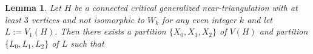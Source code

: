 \documentclass[12pt]{article}
\newtheorem{lem}{Lemma}
\theoremstyle{definition}
\newcommand{\pat}[1]{[\textcolor{red}{PM: #1}]}
\begin{document}
\begin{lem}\label{critical}
  Let $H$ be a connected critical generalized near-triangulation with at least $3$ vertices and not isomorphic to $W_k$ for any even integer $k$ and let $L:=V_1(H)$.  Then there exists a partition $\{X_0,X_1,X_2\}$ of $V(H)$ and partition $\{L_0,L_1,L_2\}$ of $L$ such that
\end{lem}
\end{document}
